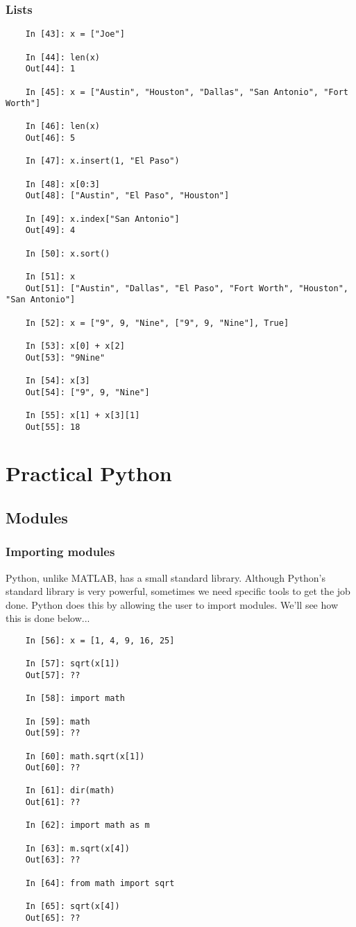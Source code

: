 \documentclass{beamer}
\begin{document}
\begin{frame}[fragile]
\frametitle{Lists}
\begin{lstlisting}
	In [43]: x = ["Joe"]
	
	In [44]: len(x)
	Out[44]: 1 

	In [45]: x = ["Austin", "Houston", "Dallas", "San Antonio", "Fort Worth"]

	In [46]: len(x)
	Out[46]: 5 

	In [47]: x.insert(1, "El Paso")

	In [48]: x[0:3]
	Out[48]: ["Austin", "El Paso", "Houston"] 

	In [49]: x.index["San Antonio"]
	Out[49]: 4 

	In [50]: x.sort()

	In [51]: x
	Out[51]: ["Austin", "Dallas", "El Paso", "Fort Worth", "Houston", "San Antonio"] 

	In [52]: x = ["9", 9, "Nine", ["9", 9, "Nine"], True]

	In [53]: x[0] + x[2]
	Out[53]: "9Nine" 

	In [54]: x[3]
	Out[54]: ["9", 9, "Nine"] 

	In [55]: x[1] + x[3][1]
	Out[55]: 18 
\end{lstlisting}
\end{frame}

\section{Practical Python}

\subsection{Modules}

\begin{frame}[fragile]
\frametitle{Importing modules}

Python, unlike MATLAB, has a small standard library. Although Python's standard library is very powerful, sometimes we need specific tools to get the job done. Python does this by allowing the user to import modules. We'll see how this is done below...

\begin{lstlisting}
	In [56]: x = [1, 4, 9, 16, 25]

	In [57]: sqrt(x[1])
	Out[57]: ?? 
	
	In [58]: import math

	In [59]: math
	Out[59]: ??

	In [60]: math.sqrt(x[1])
	Out[60]: ??

	In [61]: dir(math)
	Out[61]: ??

	In [62]: import math as m

	In [63]: m.sqrt(x[4])
	Out[63]: ??

	In [64]: from math import sqrt

	In [65]: sqrt(x[4])
	Out[65]: ??
\end{lstlisting}
\end{frame}
\end{document}
